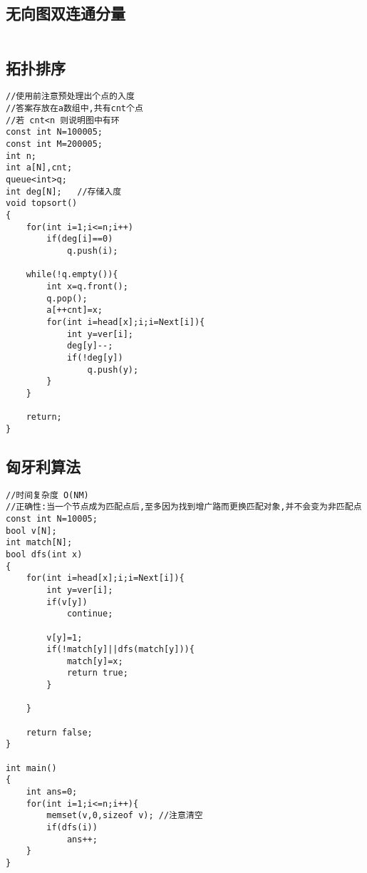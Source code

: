 \documentclass[twocolumn,a4]{article}
\begin{document}
\subsection{无向图双连通分量}
\begin{lstlisting}

\end{lstlisting}

\subsection{拓扑排序}
\begin{lstlisting}
//使用前注意预处理出个点的入度
//答案存放在a数组中,共有cnt个点
//若 cnt<n 则说明图中有环
const int N=100005;
const int M=200005;
int n;
int a[N],cnt;
queue<int>q;
int deg[N];   //存储入度
void topsort()
{
    for(int i=1;i<=n;i++)
        if(deg[i]==0)
            q.push(i);
            
    while(!q.empty()){
        int x=q.front();
        q.pop();
        a[++cnt]=x;
        for(int i=head[x];i;i=Next[i]){
            int y=ver[i];
            deg[y]--;
            if(!deg[y])
                q.push(y);
        }
    }
    
    return;
}
\end{lstlisting}

\subsection{匈牙利算法}
\begin{lstlisting}
//时间复杂度 O(NM)
//正确性:当一个节点成为匹配点后,至多因为找到增广路而更换匹配对象,并不会变为非匹配点
const int N=10005;
bool v[N];
int match[N];
bool dfs(int x)
{
    for(int i=head[x];i;i=Next[i]){
        int y=ver[i];
        if(v[y])
            continue;
            
        v[y]=1;
        if(!match[y]||dfs(match[y])){
            match[y]=x;
            return true;
        }
        
    }
    
    return false;
}

int main()
{
    int ans=0;
    for(int i=1;i<=n;i++){
        memset(v,0,sizeof v); //注意清空
        if(dfs(i))
            ans++;
    }
}
\end{lstlisting}
\end{document}
